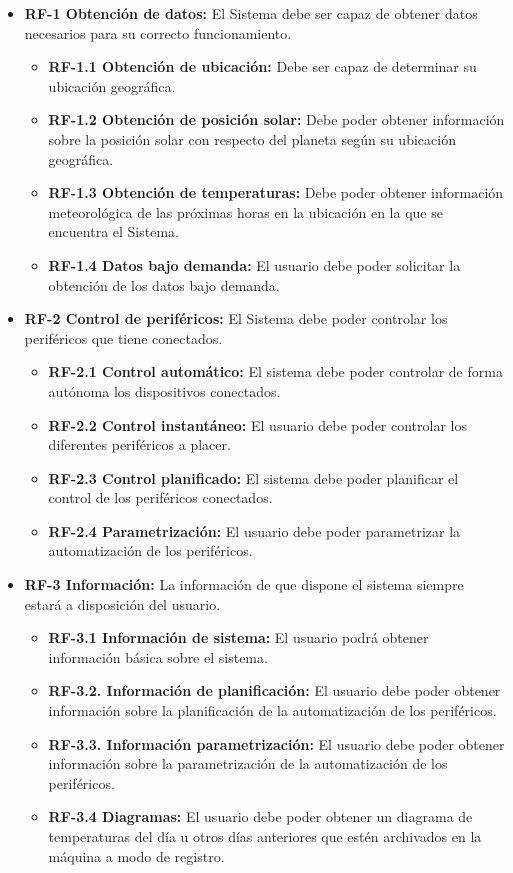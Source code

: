 \begin{itemize}
    \item \textbf{RF-1 Obtención de datos:} El Sistema debe ser capaz de obtener datos necesarios para su correcto funcionamiento.
    \begin{itemize}
        \item \textbf{RF-1.1 Obtención de ubicación:} Debe ser capaz de determinar su ubicación geográfica.
        \item \textbf{RF-1.2 Obtención de posición solar:} Debe poder obtener información sobre la posición solar con respecto del planeta según su ubicación geográfica.
        \item \textbf{RF-1.3 Obtención de temperaturas:} Debe poder obtener información meteorológica de las próximas horas en la ubicación en la que se encuentra el Sistema.
        \item \textbf{RF-1.4 Datos bajo demanda:} El usuario debe poder solicitar la obtención de los datos bajo demanda.
    \end{itemize}

    \item \textbf{RF-2 Control de periféricos:} El Sistema debe poder controlar los periféricos que tiene conectados.
    \begin{itemize}
        \item \textbf{RF-2.1 Control automático:} El sistema debe poder controlar de forma autónoma los dispositivos conectados.
        \item \textbf{RF-2.2 Control instantáneo:} El usuario debe poder controlar los diferentes periféricos a placer.
        \item \textbf{RF-2.3 Control planificado:} El sistema debe poder planificar el control de los periféricos conectados.
        \item \textbf{RF-2.4 Parametrización:} El usuario debe poder parametrizar la automatización de los periféricos.
    \end{itemize}
    
    \item \textbf{RF-3 Información:} La información de que dispone el sistema siempre estará a disposición del usuario.
    \begin{itemize}
        \item \textbf{RF-3.1 Información de sistema:} El usuario podrá obtener información básica sobre el sistema.
        \item \textbf{RF-3.2. Información de planificación:} El usuario debe poder obtener información sobre la planificación de la automatización de los periféricos.
        \item \textbf{RF-3.3. Información parametrización:} El usuario debe poder obtener información sobre la parametrización de la automatización de los periféricos.
        \item \textbf{RF-3.4 Diagramas:} El usuario debe poder obtener un diagrama de temperaturas del día u otros días anteriores que estén archivados en la máquina a modo de registro.
    \end{itemize}
    

\end{itemize}
